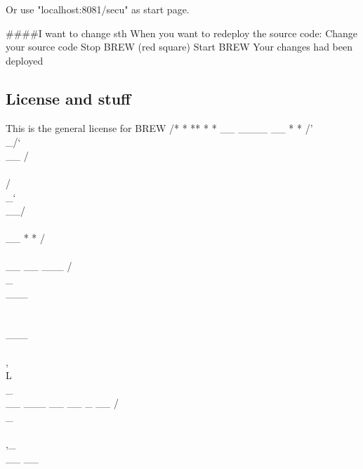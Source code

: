 \documentclass{llncs}%
\begin{document}
Or use "localhost:8081/secu" as start page.

####I want to change sth
When you want to redeploy the source code:
Change your source code
Stop BREW (red square)
Start BREW
Your changes had been deployed
\nwendcode{}\nwdocspar

\subsection{License and stuff}
This is the general license for BREW
\nwenddocs{}\endmoddef\nwstartdeflinemarkup{}\nwenddeflinemarkup
/*
 * **
 *  *                                        __          ____                                     __
 *  *     /'\\_/`\\                 __        /\\ \\        /\\  _`\\                                __/\\ \\__
 *  *    /\\      \\  __  __   ___ /\\_\\    ___\\ \\ \\___    \\ \\,\\L\\_\\     __    ___  __  __  _ __ /\\_\\ \\ ,_\\  __  __
\end{document}
